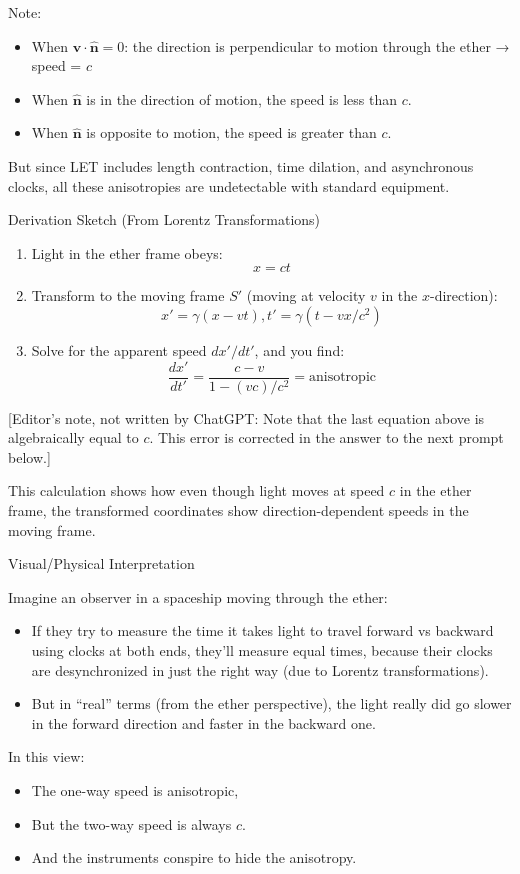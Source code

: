 \documentclass[a4paper]{article}
\theoremstyle{plain}
\theoremstyle{definition}
\newcommand{\vect}[1]{\mathbf{#1}}
\newcommand{\hatvec}[1]{\hat{\mathbf{#1}}}
\begin{document}
Note:
\begin{itemize}
\item When $\vect{v} \cdot \hatvec{n} = 0$: the direction is
  perpendicular to motion through the ether → speed = $c$
\item When $\hatvec{n}$ is in the direction of motion, the speed is
  less than $c$.
\item When $\hatvec{n}$ is opposite to motion, the speed is greater
  than $c$.
\end{itemize}
But since LET includes length contraction, time dilation, and
asynchronous clocks, all these anisotropies are undetectable with
standard equipment.

Derivation Sketch (From Lorentz Transformations)

\begin{enumerate}

\item Light in the ether frame obeys:
\begin{equation}
x = ct
\end{equation}

\item Transform to the moving frame $S'$ (moving at velocity $v$ in
  the $x$-direction):
\begin{equation}
x' = \gamma(x-vt), t' = \gamma(t-vx/c^2)
\end{equation}

\item Solve for the apparent speed $dx'/dt'$, and you find:
\begin{equation}
\frac{dx'}{dt'} = \frac{c-v}{1-(vc)/c^2} = \text{anisotropic}
\end{equation}
\end{enumerate}

[Editor's note, not written by ChatGPT: Note that the last equation
above is algebraically equal to $c$.  This error is corrected in the
answer to the next prompt below.]

This calculation shows how even though light moves at speed $c$ in the
ether frame, the transformed coordinates show direction-dependent
speeds in the moving frame.

Visual/Physical Interpretation

Imagine an observer in a spaceship moving through the ether:
\begin{itemize}
\item If they try to measure the time it takes light to travel forward
  vs backward using clocks at both ends, they'll measure equal times,
  because their clocks are desynchronized in just the right way (due
  to Lorentz transformations).
\item But in ``real'' terms (from the ether perspective), the light
  really did go slower in the forward direction and faster in the
  backward one.
\end{itemize}
In this view:
\begin{itemize}
\item The one-way speed is anisotropic,
\item But the two-way speed is always $c$.
\item And the instruments conspire to hide the anisotropy.
\end{itemize}
\end{document}
